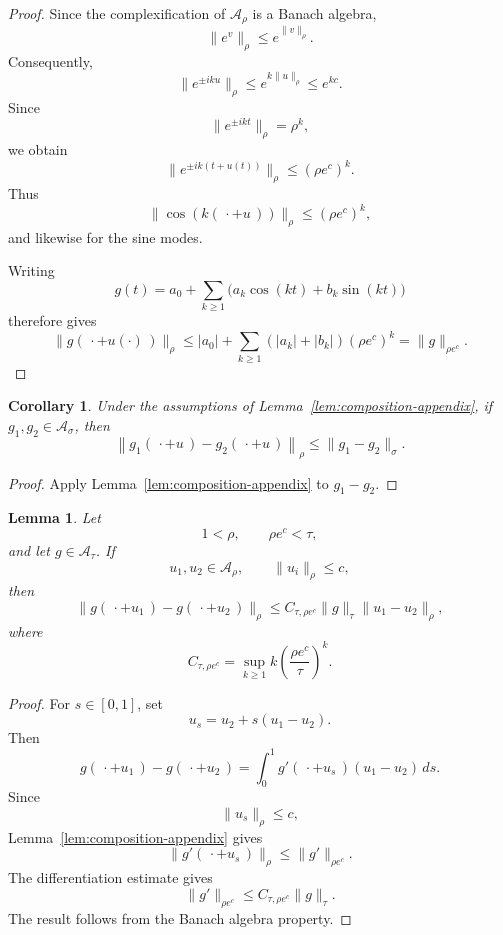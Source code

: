 \documentclass[11pt,a4paper]{amsart}
\newtheorem{lemma}[theorem]{Lemma}
\newtheorem{corollary}[theorem]{Corollary}
\begin{document}
\begin{proof}
	Since the complexification of $\mathcal A_\rho$ is a Banach algebra,
	\[
	\|e^v\|_\rho
	\le
	e^{\|v\|_\rho}.
	\]
	Consequently,
	\[
	\|e^{\pm iku}\|_\rho
	\le
	e^{k\|u\|_\rho}
	\le
	e^{kc}.
	\]
	Since
	\[
	\|e^{\pm ikt}\|_\rho=\rho^k,
	\]
	we obtain
	\[
	\|e^{\pm ik(t+u(t))}\|_\rho
	\le
	(\rho e^c)^k.
	\]
	Thus
	\[
	\|\cos(k(\,\cdot+u\,))\|_\rho
	\le
	(\rho e^c)^k,
	\]
	and likewise for the sine modes.
	
	Writing
	\[
	g(t)
	=
	a_0+
	\sum_{k\ge1}
	\bigl(a_k\cos(kt)+b_k\sin(kt)\bigr)
	\]
	therefore gives
	\[
	\|g(\,\cdot+u(\cdot)\,)\|_\rho
	\le
	|a_0|
	+
	\sum_{k\ge1}
	(|a_k|+|b_k|)(\rho e^c)^k
	=
	\|g\|_{\rho e^c}.
	\]
\end{proof}


\begin{corollary}\label{cor:composition-difference}
	Under the assumptions of
	Lemma~\ref{lem:composition-appendix}, if
	$g_1,g_2\in\mathcal A_\sigma$, then
	\[
	\left\|
	g_1(\,\cdot+u\,)
	-
	g_2(\,\cdot+u\,)
	\right\|_\rho
	\le
	\|g_1-g_2\|_\sigma.
	\]
\end{corollary}

\begin{proof}
	Apply Lemma~\ref{lem:composition-appendix} to $g_1-g_2$.
\end{proof}


\begin{lemma}\label{lem:composition-u-appendix}
	Let
	\[
	1<\rho,
	\qquad
	\rho e^c<\tau,
	\]
	and let $g\in\mathcal A_\tau$. If
	\[
	u_1,u_2\in\mathcal A_\rho,
	\qquad
	\|u_i\|_\rho\le c,
	\]
	then
	\begin{equation}\label{eq:composition-u-appendix}
		\|g(\,\cdot+u_1\,)-g(\,\cdot+u_2\,)\|_\rho
		\le
		C_{\tau,\rho e^c}
		\|g\|_\tau
		\|u_1-u_2\|_\rho,
	\end{equation}
	where
	\[
	C_{\tau,\rho e^c}
	=
	\sup_{k\ge1}
	k
	\left(
	\frac{\rho e^c}{\tau}
	\right)^k.
	\]
\end{lemma}

\begin{proof}
	For $s\in[0,1]$, set
	\[
	u_s=u_2+s(u_1-u_2).
	\]
	Then
	\[
	g(\,\cdot+u_1\,)-g(\,\cdot+u_2\,)
	=
	\int_0^1
	g'(\,\cdot+u_s\,)(u_1-u_2)\,ds.
	\]
	Since
	\[
	\|u_s\|_\rho\le c,
	\]
	Lemma~\ref{lem:composition-appendix} gives
	\[
	\|g'(\,\cdot+u_s\,)\|_\rho
	\le
	\|g'\|_{\rho e^c}.
	\]
	The differentiation estimate gives
	\[
	\|g'\|_{\rho e^c}
	\le
	C_{\tau,\rho e^c}\|g\|_\tau.
	\]
	The result follows from the Banach algebra property.
\end{proof}
\end{document}
